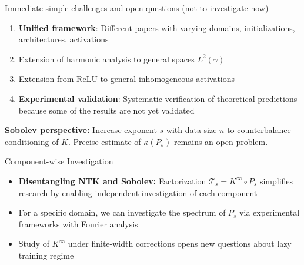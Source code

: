 \documentclass{beamer}
\begin{document}
\begin{frame}{Immediate simple challenges and open questions (not to investigate now)}
\begin{enumerate}
\item \textbf{Unified framework}: Different papers with varying domains, initializations, architectures, activations

\item Extension of harmonic analysis to general spaces $L^2(\gamma)$

\item  Extension from ReLU to general inhomogeneous activations

\item \textbf{Experimental validation}: Systematic verification of theoretical predictions because some of the results are not yet validated
\end{enumerate}

\textbf{Sobolev perspective:} Increase exponent $s$ with data size $n$ to counterbalance conditioning of $K$. Precise estimate of $\kappa(P_s)$ remains an open problem.
\end{frame}



  
\begin{frame}{Component-wise Investigation}
  \begin{itemize}
  \item \textbf{Disentangling NTK and Sobolev:} Factorization $\mathcal{T}_s = K^{\infty} \circ P_s$ simplifies research by enabling independent investigation of each component
  
  \item For a specific domain, we can investigate the spectrum of $P_s$ via experimental frameworks with Fourier analysis
  
  \item Study of $K^{\infty}$ under finite-width corrections opens new questions about lazy training regime
  \end{itemize}
  \end{frame}
\end{document}
